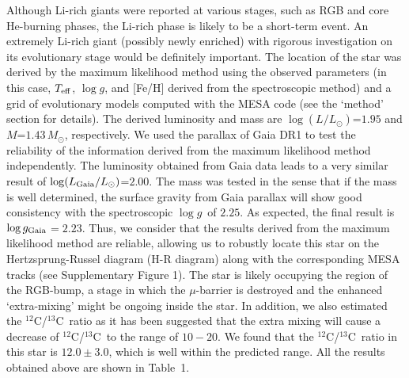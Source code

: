 \documentclass[twoside,onecolumnm,12pt]{article}
\newcommand{\upcite}[1]{\textsuperscript{\textsuperscript{\cite{#1}}}}
\newcommand{\Teff}{$T_{\rm eff}$}
\newcommand{\logg}{$\log g$}
\newcommand{\logggaia}{$\log g_{\rm Gaia}$}
\newcommand{\ciso}{$^{12}$C/$^{13}$C}
\begin{document}
Although Li-rich giants were reported at various stages, such as 
RGB and core He-burning phases\upcite{Silva2014}, the Li-rich 
phase is likely to be a short-term event.
An extremely Li-rich giant (possibly newly enriched) with rigorous 
investigation on its evolutionary stage would be definitely important.
The location of the star was derived by the maximum
likelihood method using the observed parameters (in
this case, \Teff, \logg, and [Fe/H] derived from the spectroscopic
method) and a grid of evolutionary models computed
with the MESA code (see the `method' section for details). 
The derived luminosity and mass are
$\log (L/L_{\odot})$=$1.95$ and $M$=$1.43$\,$M_{\odot}$,
respectively. 
We used the parallax of Gaia DR1\upcite{Gaia2016} to test the reliability of the
information derived from the maximum likelihood method independently.
The luminosity obtained from Gaia data leads to a very 
similar result of $\log (L_{\rm{Gaia}}/L_{\odot})$=$2.00$.
The mass was tested in the sense that if the mass is well determined, the surface
gravity from Gaia parallax will show good consistency with the
spectroscopic \logg\ of $2.25$. As expected, the final result is
\logggaia$=2.23$. 
Thus, we consider that the results derived from the maximum
likelihood method are reliable, allowing us to robustly locate this
star on the Hertzsprung-Russel diagram (H-R diagram) along with the
corresponding MESA tracks (see Supplementary Figure 1). The star is 
likely occupying the region of the RGB-bump, a stage in which 
the $\mu$-barrier is destroyed and the enhanced
`extra-mixing' might be ongoing inside the star. In addition, we
also estimated the \ciso\ ratio as it has been suggested that the
extra mixing will cause a decrease of \ciso\ to the range of $10 -
20$. We found that the \ciso\ ratio in this star is
$12.0\pm3.0$, which is well within the predicted range. All the
results obtained above are shown in Table~1.
\end{document}

